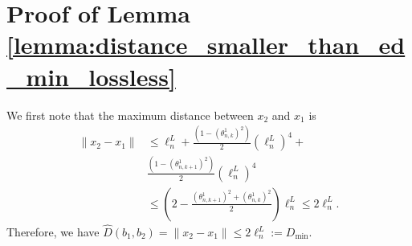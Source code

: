 \documentclass[Afour,sageh,times]{sagej}
\begin{document}
\section{Proof of Lemma \ref{lemma:distance_smaller_than_ed_min_lossless}\label{appendix:distance_smaller_lossless}}
{ We first note that the maximum distance between $x_2$ and $x_1$ is
\begin{align*}
    \|x_2-x_1\| &\leq \ell^L_n+\frac{(1-(\theta^1_{n,k})^2)}{2}(\ell^L_n)^4+\nonumber\\
    &\frac{(1-(\theta^1_{n,k+1})^2)}{2}(\ell^L_n)^4\nonumber\\
    &\leq\left(2-\frac{(\theta^1_{n,k+1})^2+(\theta^1_{n,k})^2}{2}\right)\ell^L_n\nonumber \leq 2 \ell^L_n.
\end{align*}
}
Therefore, we have $\hat{D}(b_1,b_2)=\|x_2-x_1\|\leq 2\ell^L_n:=D_\text{min}$.
\end{document}
